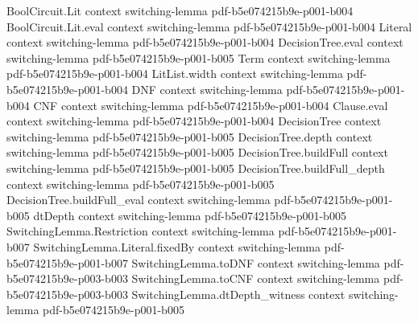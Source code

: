 \begin{lemma}
\label{SwitchingLemma.dtDepth_le_implies_small_dnf_cnf}
\leanok
{}
\proofstep
  {BoolCircuit.Lit}
  {context}
  {switching-lemma}
  {pdf-b5e074215b9e-p001-b004}
\proofstep
  {BoolCircuit.Lit.eval}
  {context}
  {switching-lemma}
  {pdf-b5e074215b9e-p001-b004}
\proofstep
  {Literal}
  {context}
  {switching-lemma}
  {pdf-b5e074215b9e-p001-b004}
\proofstep
  {DecisionTree.eval}
  {context}
  {switching-lemma}
  {pdf-b5e074215b9e-p001-b005}
\proofstep
  {Term}
  {context}
  {switching-lemma}
  {pdf-b5e074215b9e-p001-b004}
\proofstep
  {LitList.width}
  {context}
  {switching-lemma}
  {pdf-b5e074215b9e-p001-b004}
\proofstep
  {DNF}
  {context}
  {switching-lemma}
  {pdf-b5e074215b9e-p001-b004}
\proofstep
  {CNF}
  {context}
  {switching-lemma}
  {pdf-b5e074215b9e-p001-b004}
\proofstep
  {Clause.eval}
  {context}
  {switching-lemma}
  {pdf-b5e074215b9e-p001-b004}
\proofstep
  {DecisionTree}
  {context}
  {switching-lemma}
  {pdf-b5e074215b9e-p001-b005}
\proofstep
  {DecisionTree.depth}
  {context}
  {switching-lemma}
  {pdf-b5e074215b9e-p001-b005}
\proofstep
  {DecisionTree.buildFull}
  {context}
  {switching-lemma}
  {pdf-b5e074215b9e-p001-b005}
\proofstep
  {DecisionTree.buildFull_depth}
  {context}
  {switching-lemma}
  {pdf-b5e074215b9e-p001-b005}
\proofstep
  {DecisionTree.buildFull_eval}
  {context}
  {switching-lemma}
  {pdf-b5e074215b9e-p001-b005}
\proofstep
  {dtDepth}
  {context}
  {switching-lemma}
  {pdf-b5e074215b9e-p001-b005}
\proofstep
  {SwitchingLemma.Restriction}
  {context}
  {switching-lemma}
  {pdf-b5e074215b9e-p001-b007}
\proofstep
  {SwitchingLemma.Literal.fixedBy}
  {context}
  {switching-lemma}
  {pdf-b5e074215b9e-p001-b007}
\proofstep
  {SwitchingLemma.toDNF}
  {context}
  {switching-lemma}
  {pdf-b5e074215b9e-p003-b003}
\proofstep
  {SwitchingLemma.toCNF}
  {context}
  {switching-lemma}
  {pdf-b5e074215b9e-p003-b003}
\proofstep
  {SwitchingLemma.dtDepth_witness}
  {context}
  {switching-lemma}
  {pdf-b5e074215b9e-p001-b005}

\end{lemma}
